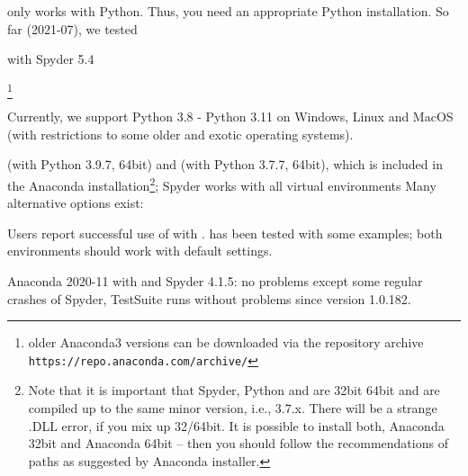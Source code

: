 \codeName only works with Python. Thus, you need an appropriate Python installation.
So far (2021-07), we tested
\bi
  \item {} with Spyder 5.4
  \item {}\footnote{older Anaconda3 versions can be downloaded via the repository archive \texttt{https://repo.anaconda.com/archive/}}
  \item Currently, we support Python 3.8 - Python 3.11  on Windows, Linux and MacOS (with restrictions to some older and exotic operating systems).
  \item {} (with Python 3.9.7, 64bit) and  (with Python 3.7.7, 64bit), which is included in the Anaconda installation\footnote{Note that it is important that Spyder, Python and \codeName  are  32bit  64bit and are compiled up to the same minor version, i.e., 3.7.x. There will be a strange .DLL error, if you mix up 32/64bit. It is possible to install both, Anaconda 32bit and Anaconda 64bit -- then you should follow the recommendations of paths as suggested by Anaconda installer.}; Spyder works with all virtual environments
\ei
Many alternative options exist:
\bi
  \item Users report successful use of \codeName with .  has been tested with some examples; both environments should work with default settings.
  \item Anaconda 2020-11 with  and Spyder 4.1.5: no problems except some regular crashes of Spyder, TestSuite runs without problems since \codeName version 1.0.182.

